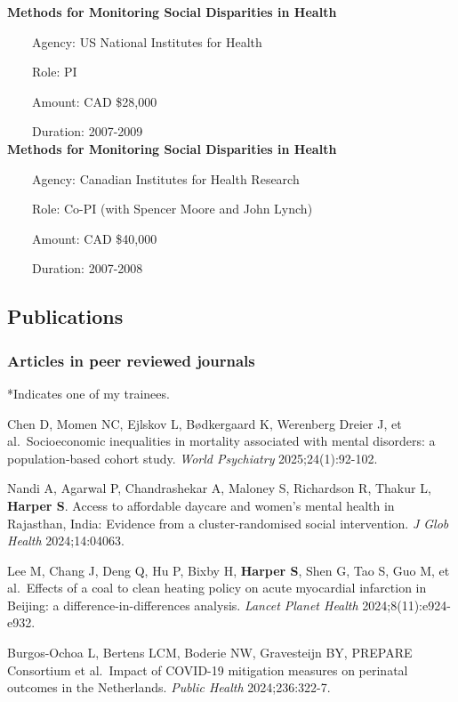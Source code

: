 \documentclass[
  letterpaper,
  DIV=11,
  numbers=noendperiod]{scrartcl}
\begin{document}
\textbf{Methods for Monitoring Social Disparities in Health}\\
\strut ~~~~Agency: US National Institutes for Health\\
\strut ~~~~Role: PI\\
\strut ~~~~Amount: CAD \$28,000\\
\strut ~~~~Duration: 2007-2009\\

\textbf{Methods for Monitoring Social Disparities in Health}\\
\strut ~~~~Agency: Canadian Institutes for Health Research\\
\strut ~~~~Role: Co-PI (with Spencer Moore and John Lynch)\\
\strut ~~~~Amount: CAD \$40,000\\
\strut ~~~~Duration: 2007-2008\\

\subsection{Publications}\label{publications}

\subsubsection{Articles in peer reviewed
journals}\label{articles-in-peer-reviewed-journals}

*Indicates one of my trainees.

Chen D, Momen NC, Ejlskov L, Bødkergaard K, Werenberg Dreier J, et
al.~Socioeconomic inequalities in mortality associated with mental
disorders: a population‐based cohort study. \emph{World Psychiatry}
2025;24(1):92-102.

Nandi A, Agarwal P, Chandrashekar A, Maloney S, Richardson R, Thakur L,
\textbf{Harper S}. Access to affordable daycare and women's mental
health in Rajasthan, India: Evidence from a cluster-randomised social
intervention. \emph{J Glob Health} 2024;14:04063.

Lee M, Chang J, Deng Q, Hu P, Bixby H, \textbf{Harper S}, Shen G, Tao S,
Guo M, et al.~Effects of a coal to clean heating policy on acute
myocardial infarction in Beijing: a difference-in-differences analysis.
\emph{Lancet Planet Health} 2024;8(11):e924-e932.

Burgos-Ochoa L, Bertens LCM, Boderie NW, Gravesteijn BY, PREPARE
Consortium et al.~Impact of COVID-19 mitigation measures on perinatal
outcomes in the Netherlands. \emph{Public Health} 2024;236:322-7.
\end{document}
